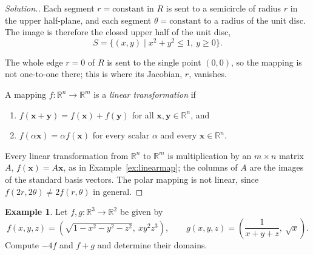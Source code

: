 \documentclass[11pt,a4paper]{article}
\theoremstyle{definition}
\newtheorem{exa}[thm]{Example}
\newenvironment{solution}
  {\renewcommand{\qedsymbol}{}\begin{proof}[\textit{Solution}.]}
  {\end{proof}}
\begin{document}
\begin{solution}
Each segment $r = \text{constant}$ in $R$ is sent to a semicircle of radius $r$
in the upper half-plane, and each segment $\theta = \text{constant}$ to a radius
of the unit disc. The image is therefore the closed upper half of the unit
disc,
\[S = \{(x,y) \mid x^2 + y^2\leq 1,\ y\geq 0\}.\]

\begin{figure}[H]
\centering
{}
\end{figure}

The whole edge $r = 0$ of $R$ is sent to the single point $(0,0)$, so the
mapping is not one-to-one there; this is where its Jacobian, $r$, vanishes.

A mapping $f: \mathbb{R}^n \to \mathbb{R}^m$ is a \emph{linear transformation} if
\begin{enumerate}
\item $f(\mathbf x+\mathbf y) = f(\mathbf x) + f(\mathbf y)$ for all
$\mathbf x,\mathbf y \in \mathbb{R}^n$, and

\item $f(\alpha \mathbf x) = \alpha f(\mathbf x)$ for every scalar $\alpha$ and
every $\mathbf x \in \mathbb{R}^n$.
\end{enumerate}
Every linear transformation from $\mathbb{R}^n$ to $\mathbb{R}^m$ is
multiplication by an $m\times n$ matrix $A$, $f(\mathbf x) = A\mathbf x$, as in
Example~\ref{ex:linearmap}; the columns of $A$ are the images of the standard
basis vectors. The polar mapping is not linear, since
$f(2r,2\theta)\neq 2f(r,\theta)$ in general.
\end{solution}

\begin{exa}
\label{ex:mapdomains}
Let $f,g: \mathbb{R}^3 \to \mathbb{R}^2$ be given by
\[f(x,y,z) =\left(\sqrt{1 - x^2 - y^2 -z^2},\ xy^2z^3\right),\qquad g(x,y,z) =
\left(\frac{1}{x + y + z},\ \sqrt{x}\right).\]
Compute $-4f$ and $f+g$ and determine their domains.
\end{exa}
\end{document}
